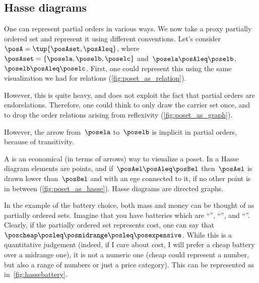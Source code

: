 \subsection{Hasse diagrams}
One can represent partial orders in various ways.
We now take a proxy partially ordered set and represent it using different conventions.
Let's consider~$\posA=\tup{\posAset,\posAleq}$, where~$\posAset=\{\posela,\poselb,\poselc\}$ and~$\posela\posAleq \poselb$,~$\poselb\posAleq \poselc$.
First, one could represent this using the same visualization we had for relations (\cref{fig:poset_as_relation}).

\begin{marginfigure}
	\begin{center}
	\end{center}
	\caption{\label{fig:poset_as_relation}}
\end{marginfigure}
However, this is quite heavy, and does not exploit the fact that partial orders are endorelations.
Therefore, one could think to only draw the carrier set once, and to drop the order relations arising from reflexivity (\cref{fig:poset_as_graph}).
\begin{marginfigure}
	\begin{center}
	\end{center}
	\caption{\label{fig:poset_as_graph}}
\end{marginfigure}
However, the arrow from~$\posela$ to~$\poselb$ is implicit in partial orders, because of transitivity.

A \emph{} is an economical (in terms of arrows) way to visualize a poset.
In a Hasse diagram elements are points, and if~$\posAel \posAleq \posBel$ then~$\posAel$ is drawn lower than~$\posBel$ and with an ege connected to it, if no other point is in between (\cref{fig:poset_as_hasse}).
Hasse diagrams are directed graphs.

\begin{marginfigure}
	\begin{center}
	\end{center}
	\caption{\label{fig:poset_as_hasse}}
\end{marginfigure}

In the example of the battery choice, both mass and money can be thought of as partially ordered sets.
Imagine that you have batteries which are ``\poscheap'', ``\posmidrange'', and ``\posexpensive''.
Clearly, if the partially ordered set represents cost, one can say that~$\poscheap \posleq\posmidrange \posleq\posexpensive$.
While this is a quantitative judgement (indeed, if I care about cost, I will prefer a cheap battery over a midrange one), it is not a numeric one (cheap could represent a number, but also a range of numbers or just a price category).
This can be represented as in~\cref{fig:hassebattery}.

